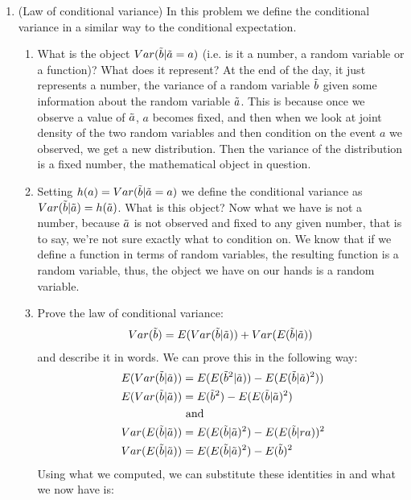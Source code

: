 \documentclass[12pt,twoside]{article}
\newcommand{\rnd}{\Tilde}
\newcommand{\rb}{\rnd{ b}  }
\newcommand{\ra}{\rnd{ a}  }
\newcommand{\E}{E}
\newcommand{\cnd}{|}
\newcommand{\Var}{Var}
\begin{document}
\begin{enumerate}
\item (Law of conditional variance) 
In this problem we define the conditional variance in a similar way to the conditional expectation. 
\begin{enumerate}
\item What is the object $\Var ( \rb \cnd \ra = a)$ (i.e. is it a number, a random variable or a function)? What does it represent?
\subitem At the end of the day, it just represents a number, the variance of a random variable $\rb$ given some information about the random variable $\ra$. This is because once we observe a value of $\ra$, $a$ becomes fixed, and then when we look at joint density of the two random variables and then condition on the event $a$ we observed, we get a new distribution. Then the variance of the distribution is a fixed number, the mathematical object in question.
\item Setting $h(a) = \Var (\rb \cnd \ra = a)$ we define the conditional variance as $\Var (\rb \cnd \ra) = h(\ra)$. What is this object? 
\subitem
Now what we have is not a number, because $\ra$ is not observed and fixed to any given number, that is to say, we're not sure exactly what to condition on. We know that if we define a function in terms of random variables, the resulting function is a random variable, thus, the object we have on our hands is a random variable. 
\item Prove the law of conditional variance:
\begin{align}
\Var (\rb) = \E ( \Var(\rb \cnd \ra) ) + \Var ( \E (\rb \cnd \ra))
\end{align}
and describe it in words.
\subitem
We can prove this in the following way:
\begin{equation}
    \begin{split}
        E(\Var (\rb|\ra)) &= \E (\E(\rb^2 \cnd \ra) ) - \E ( \E (\rb \cnd \ra)^2))\\
        E(\Var (\rb|\ra)) &= \E(\rb^2) - \E ( \E (\rb \cnd \ra)^2) \\
        &\text{ and } \\ 
        Var(E(\rb|\ra)) &= E(E(\rb|\ra)^2) - E(E(\rb|ra))^2 \\\
        Var(E(\rb|\ra)) &= E(E(\rb|\ra)^2) - E(\rb)^2 
    \end{split}
\end{equation}
Using what we computed, we can substitute these identities in and what we now have is: 
\begin{equation}
    \begin{split}

\end{split}
\end{equation}
\end{enumerate}
\end{enumerate}
\end{document}
